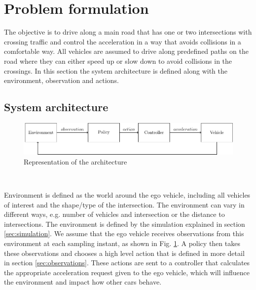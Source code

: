 \section{Problem formulation}
\label{sec:model}
The objective is to drive along a main road that has one or two intersections with crossing traffic and control the acceleration in a way that avoids collisions in a comfortable way. All vehicles are assumed to drive along predefined paths on the road where they can either speed up or slow down to avoid collisions in the crossings. 
In this section the system architecture is defined along with the environment, observation and actions. 


\subsection{System architecture}
\begin{figure}[!ht]
	\centering
	\includegraphics[width=0.9\columnwidth]{figures/figures-architecture.pdf}
	\caption{Representation of the architecture}
	\label{fig:Architecture}
\end{figure}\

Environment is defined as the world around the ego vehicle, including all vehicles of interest and the shape/type of the intersection. The environment can vary in different ways, e.g. number of vehicles and intersection or the distance to intersections. The environment is defined by the simulation explained in section \ref{sec:simulation}. We assume that the ego vehicle receives observations from this environment at each sampling instant, as shown in Fig. \ref{fig:Architecture}. A policy then takes these observations and chooses a high level action that is defined in more detail in section \ref{sec:observations}. These actions are sent to a controller that calculates the appropriate acceleration request given to the ego vehicle, which will influence the environment and impact how other cars behave. 


